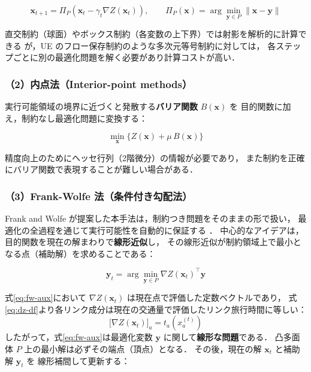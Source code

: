 \begin{equation}
  \boldsymbol{x}_{t+1}
  = \Pi_P\!\left(\boldsymbol{x}_t - \gamma_t \nabla Z(\boldsymbol{x}_t)\right),
  \qquad
  \Pi_P(\boldsymbol{x}) = \arg\min_{\boldsymbol{y} \in P} \|\boldsymbol{x}-\boldsymbol{y}\|
  \label{eq:proj-gd}
\end{equation}

直交制約（球面）やボックス制約（各変数の上下界）では射影を解析的に計算できる
が，UE のフロー保存制約のような多次元等号制約に対しては，
各ステップごとに別の最適化問題を解く必要があり計算コストが高い．

\subsubsection*{（2）内点法（Interior-point methods）}

実行可能領域の境界に近づくと発散する\textbf{バリア関数} $B(\boldsymbol{x})$ を
目的関数に加え，制約なし最適化問題に変換する：

\begin{equation}
  \min_{\boldsymbol{x}} \bigl\{Z(\boldsymbol{x}) + \mu\, B(\boldsymbol{x})\bigr\}
  \label{eq:interior}
\end{equation}

精度向上のためにヘッセ行列（2階微分）の情報が必要であり，
また制約を正確にバリア関数で表現することが難しい場合がある．

\subsubsection*{（3）Frank-Wolfe 法（条件付き勾配法）}

Frank and Wolfe が提案した本手法は，制約つき問題をそのままの形で扱い，
最適化の全過程を通じて実行可能性を自動的に保証する
\cite{FrankWolfe1956}．
中心的なアイデアは，目的関数を現在の解まわりで\textbf{線形近似}し，
その線形近似が制約領域上で最小となる点（補助解）を求めることである：

\begin{equation}
  \boldsymbol{y}_t
  = \arg\min_{\boldsymbol{y} \in P}
    \nabla Z(\boldsymbol{x}_t)^{\!\top} \boldsymbol{y}
  \label{eq:fw-aux}
\end{equation}

式\eqref{eq:fw-aux}において $\nabla Z(\boldsymbol{x}_t)$ は現在点で評価した定数ベクトルであり，
式\eqref{eq:dz-df}より各リンク成分は現在の交通量で評価したリンク旅行時間に等しい：
\begin{equation}
  \bigl[\nabla Z(\boldsymbol{x}_t)\bigr]_a = t_a\!\left(x_a^{(t)}\right)
  \label{eq:fw-grad}
\end{equation}
したがって，式\eqref{eq:fw-aux}は最適化変数 $\boldsymbol{y}$ に関して\textbf{線形な問題}である．
凸多面体 $P$ 上の最小解は必ずその端点（頂点）となる．
その後，現在の解 $\boldsymbol{x}_t$ と補助解 $\boldsymbol{y}_t$ を
線形補間して更新する：

